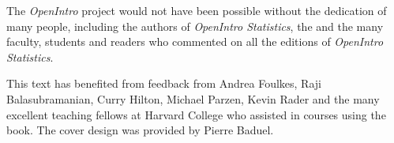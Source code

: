 The \emph{OpenIntro} project would not have been possible without the dedication of many people, including the authors of \textit{OpenIntro Statistics}, the 
 and the many faculty, students and readers who commented on all the editions of \textit{OpenIntro Statistics}.

This text has benefited from feedback from Andrea Foulkes, Raji Balasubramanian, Curry Hilton, Michael Parzen, Kevin Rader and the many excellent teaching fellows at Harvard College who assisted in courses using the book.  The cover design was provided by Pierre Baduel.


